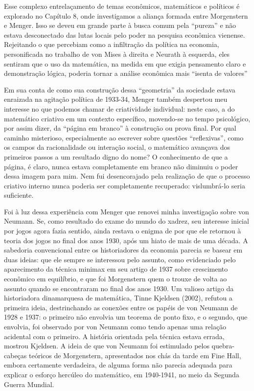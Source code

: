 \documentclass[12pt]{article}
\begin{document}
Esse complexo entrelaçamento de temas econômicos, matemáticos e políticos é explorado no Capítulo 8, onde investigamos a aliança formada entre Morgenstern e Menger. Isso se deveu em grande parte à busca comum pela “pureza” e não estava desconectado das lutas locais pelo poder na pesquisa econômica vienense. Rejeitando o que percebiam como a infiltração da política na economia, personificada no trabalho de von Mises à direita e Neurath à esquerda, eles sentiram que o uso da matemática, na medida em que exigia pensamento claro e demonstração lógica, poderia tornar a análise econômica mais “isenta de valores”

Em sua conta de como sua construção dessa “geometria” da sociedade estava enraizada na agitação política de 1933-34, Menger também despertou meu interesse no que podemos chamar de criatividade individual: neste caso, a do matemático criativo em um contexto específico, movendo-se no tempo psicológico, por assim dizer, da “página em branco” à construção ou prova final. Por qual caminho misterioso, especialmente ao escrever sobre questões “reflexivas”, como os campos da racionalidade ou interação social, o matemático avançava dos primeiros passos a um resultado digno do nome? O conhecimento de que a página, é claro, nunca estava completamente em branco não diminuiu o poder dessa imagem para mim. Nem fui desencorajado pela realização de que o processo criativo interno nunca poderia ser completamente recuperado: vislumbrá-lo seria suficiente.

Foi à luz dessa experiência com Menger que renovei minha investigação sobre von Neumann. Se, como resultado do exame do mundo do xadrez, seu interesse inicial por jogos agora fazia sentido, ainda restava o enigma de por que ele retornou à teoria dos jogos no final dos anos 1930, após um hiato de mais de uma década. A sabedoria convencional entre os historiadores da economia parecia se basear em duas ideias: que ele sempre se interessou pelo assunto, como evidenciado pelo aparecimento da técnica minimax em seu artigo de 1937 sobre crescimento econômico em equilíbrio, e que foi Morgenstern quem o trouxe de volta ao assunto quando se encontraram no final dos anos 1930. Um valioso artigo da historiadora dinamarquesa de matemática, Tinne Kjeldsen (2002), refutou a primeira ideia, destrinchando as conexões entre os papéis de von Neumann de 1928 e 1937: o primeiro não envolvia um teorema de ponto fixo, e o segundo, que envolvia, foi observado por von Neumann como tendo apenas uma relação acidental com o primeiro. A história orientada pela técnica estava errada, mostrou Kjeldsen. A ideia de que von Neumann foi estimulado pelos quebra-cabeças teóricos de Morgenstern, apresentados nos chás da tarde em Fine Hall, embora certamente verdadeira, de alguma forma não parecia adequada para explicar o esforço hercúleo do matemático, em 1940-1941, no meio da Segunda Guerra Mundial.
\end{document}
